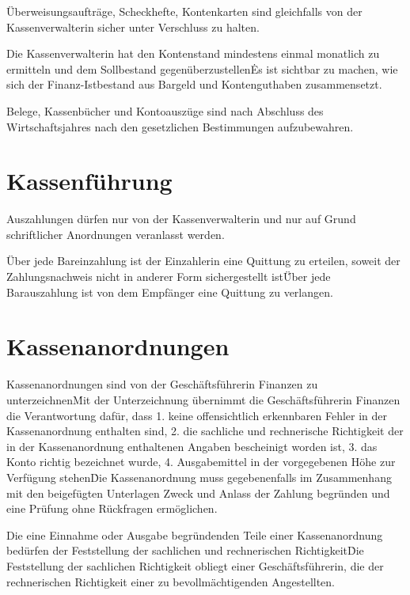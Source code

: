 \Abs \Satz Überweisungsaufträge, Scheckhefte, Kontenkarten sind gleichfalls von der Kassenverwalterin sicher unter Verschluss zu halten.

\Abs \Satz Die Kassenverwalterin hat den Kontenstand mindestens einmal monatlich zu ermitteln und dem Sollbestand gegenüberzustellen\. Es ist sichtbar zu machen, wie sich der Finanz-Istbestand aus Bargeld und Kontenguthaben zusammensetzt.

\Abs \Satz Belege, Kassenbücher und Kontoauszüge sind nach Abschluss des Wirtschaftsjahres nach den gesetzlichen Bestimmungen aufzubewahren.



\section{Kassenführung}

\Abs \Satz Auszahlungen dürfen nur von der Kassenverwalterin und nur auf Grund schriftlicher Anordnungen veranlasst werden.

\Abs \Satz Über jede Bareinzahlung ist der Einzahlerin eine Quittung zu erteilen, soweit der Zahlungsnachweis nicht in anderer Form sichergestellt ist\. Über jede Barauszahlung ist von dem Empfänger eine Quittung zu verlangen.



\section{Kassenanordnungen}

\Abs \Satz Kassenanordnungen sind von der Geschäftsführerin Finanzen zu unterzeichnen\. Mit der Unterzeichnung übernimmt die Geschäftsführerin Finanzen die Verantwortung dafür, dass
1. keine offensichtlich erkennbaren Fehler in der Kassenanordnung enthalten sind,
2. die sachliche und rechnerische Richtigkeit der in der Kassenanordnung enthaltenen Angaben bescheinigt worden ist,
3. das Konto richtig bezeichnet wurde,
4. Ausgabemittel in der vorgegebenen Höhe zur Verfügung stehen\.
Die Kassenanordnung muss gegebenenfalls im Zusammenhang mit den beigefügten Unterlagen Zweck und Anlass der Zahlung begründen und eine Prüfung ohne Rückfragen ermöglichen.

\Abs \Satz Die eine Einnahme oder Ausgabe begründenden Teile einer Kassenanordnung bedürfen der Feststellung der sachlichen und rechnerischen Richtigkeit\. Die Feststellung der sachlichen Richtigkeit obliegt einer Geschäftsführerin, die der rechnerischen Richtigkeit einer zu bevollmächtigenden Angestellten.



